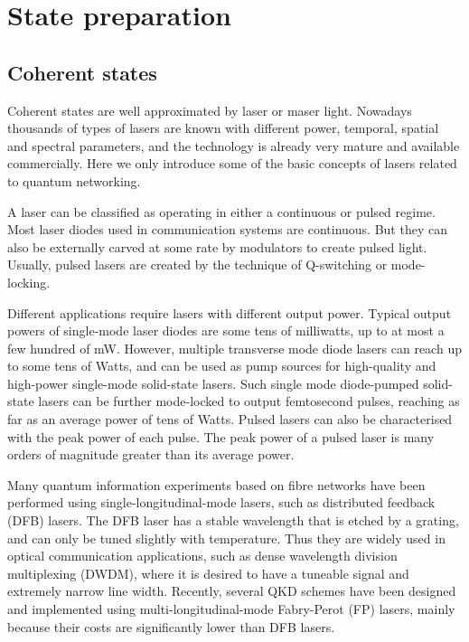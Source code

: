 %
%

\section{State preparation} 

%
%

\subsection{Coherent states} 

Coherent states are well approximated by laser or maser light. Nowadays thousands of types of lasers are known with different power, temporal, spatial and spectral parameters, and the technology is already very mature and available commercially. Here we only introduce some of the basic concepts of lasers related to quantum networking.

A laser can be classified as operating in either a continuous or pulsed regime. Most laser diodes used in communication systems are continuous. But they can also be externally carved at some rate by modulators to create pulsed light. Usually, pulsed lasers are created by the technique of Q-switching or mode-locking.

Different applications require lasers with different output power. Typical output powers of single-mode laser diodes are some tens of milliwatts, up to at most a few hundred of mW. However, multiple transverse mode diode lasers can reach up to some tens of Watts, and can be used as pump sources for high-quality and high-power single-mode solid-state lasers. Such single mode diode-pumped solid-state lasers can be further mode-locked to output femtosecond pulses, reaching as far as an average power of tens of Watts. Pulsed lasers can also be characterised with the peak power of each pulse. The peak power of a pulsed laser is many orders of magnitude greater than its average power.

Many quantum information experiments based on fibre networks \cite{bib:sun2016quantum} have been performed using single-longitudinal-mode lasers, such as distributed feedback (DFB) lasers. The DFB laser has a stable wavelength that is etched by a grating, and can only be tuned slightly with temperature. Thus they are widely used in optical communication applications, such as dense wavelength division multiplexing (DWDM), where it is desired to have a tuneable signal and extremely narrow line width. Recently, several QKD schemes \cite{bib:choi2011quantum, bib:wang2015experimental} have been designed and implemented using multi-longitudinal-mode Fabry-Perot (FP) lasers, mainly because their costs are significantly lower than DFB lasers.

